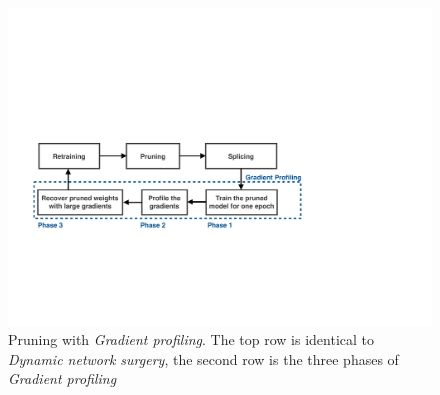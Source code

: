 \documentclass[a4paper,12pt]{report}
\begin{document}
%
\begin{figure}[!h]
  \includegraphics[width=\textwidth]{fig_gp_mech.pdf}
  \caption{Pruning with \textit{Gradient profiling}. The top row is identical to
  \textit{Dynamic network surgery}, the second row is the three phases of
  \textit{Gradient profiling}}
  \label{fig:gp_mech}
\end{figure}
\end{document}

